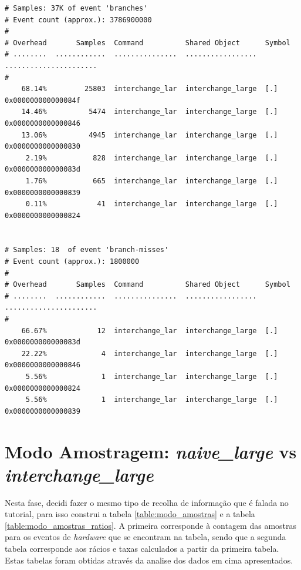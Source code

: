 \documentclass[conference,compsoc]{IEEEtran}
\begin{document}
\begin{lstlisting}
# Samples: 37K of event 'branches'
# Event count (approx.): 3786900000
#
# Overhead       Samples  Command          Shared Object      Symbol                
# ........  ............  ...............  .................  ......................
#
    68.14%         25803  interchange_lar  interchange_large  [.] 0x000000000000084f
    14.46%          5474  interchange_lar  interchange_large  [.] 0x0000000000000846
    13.06%          4945  interchange_lar  interchange_large  [.] 0x0000000000000830
     2.19%           828  interchange_lar  interchange_large  [.] 0x000000000000083d
     1.76%           665  interchange_lar  interchange_large  [.] 0x0000000000000839
     0.11%            41  interchange_lar  interchange_large  [.] 0x0000000000000824


# Samples: 18  of event 'branch-misses'
# Event count (approx.): 1800000
#
# Overhead       Samples  Command          Shared Object      Symbol                
# ........  ............  ...............  .................  ......................
#
    66.67%            12  interchange_lar  interchange_large  [.] 0x000000000000083d
    22.22%             4  interchange_lar  interchange_large  [.] 0x0000000000000846
     5.56%             1  interchange_lar  interchange_large  [.] 0x0000000000000824
     5.56%             1  interchange_lar  interchange_large  [.] 0x0000000000000839
\end{lstlisting}

\section{Modo Amostragem: \textit{naive\_large} vs \textit{interchange\_large}}

Nesta fase, decidi fazer o mesmo tipo de recolha de informação que é falada no tutorial, para isso construi a tabela \ref{table:modo_amostras} e a tabela \ref{table:modo_amostras_ratios}. A primeira corresponde à contagem das amostras para os eventos de \textit{hardware} que se encontram na tabela, sendo que a segunda tabela corresponde aos rácios e taxas calculados a partir da primeira tabela. Estas tabelas foram obtidas através da analise dos dados em cima apresentados.
\end{document}
